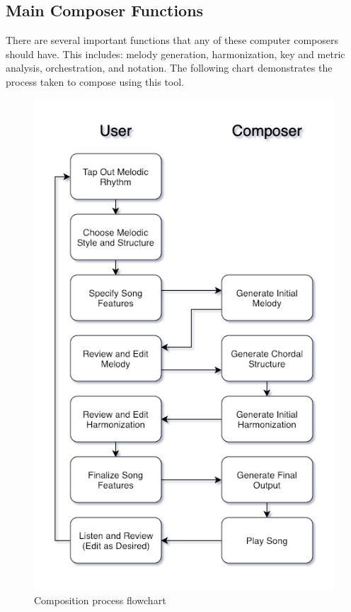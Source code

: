 \subsection{Main Composer Functions}
\label{composerfunctions}

There are several important functions that any of these computer composers should have.  This includes: melody generation, harmonization, key and metric analysis, orchestration, and notation.  The following chart demonstrates the process taken to compose using this tool.

\begin{figure}[h!]
	\centering
	\caption{Composition process flowchart}
	\includegraphics[scale=0.7]{images/composerProcess.png}
\end{figure}

